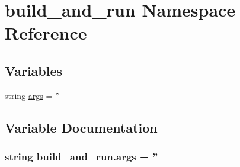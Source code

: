 \hypertarget{namespacebuild__and__run}{\section{build\-\_\-and\-\_\-run Namespace Reference}
\label{namespacebuild__and__run}
}
\subsection*{Variables}
\begin{DoxyCompactItemize}
\item 
string \hyperlink{namespacebuild__and__run_a80903621ecb225868374b9cefe1a57e8}{args} = ''
\end{DoxyCompactItemize}


\subsection{Variable Documentation}
\hypertarget{namespacebuild__and__run_a80903621ecb225868374b9cefe1a57e8}{
\subsubsection[{args}]{\setlength{\rightskip}{0pt plus 5cm}string build\-\_\-and\-\_\-run.\-args = ''}}\label{namespacebuild__and__run_a80903621ecb225868374b9cefe1a57e8}
